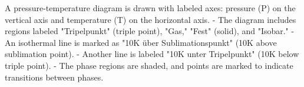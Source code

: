 A pressure-temperature diagram is drawn with labeled axes: pressure (P) on the vertical axis and temperature (T) on the horizontal axis.  
- The diagram includes regions labeled "Tripelpunkt" (triple point), "Gas," "Fest" (solid), and "Isobar."  
- An isothermal line is marked as "10K über Sublimationspunkt" (10K above sublimation point).  
- Another line is labeled "10K unter Tripelpunkt" (10K below triple point).  
- The phase regions are shaded, and points are marked to indicate transitions between phases.